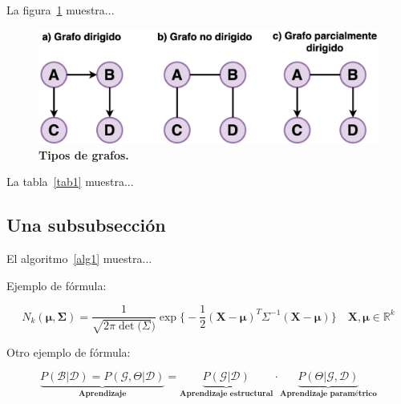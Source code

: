 La figura~\ref{fig1} muestra...

\begin{figure}[ht!]
  \centering
  \includegraphics[scale=0.15]{figuras/fig1.png}
  \caption[Tipos de grafos]{\textbf{Tipos de grafos.}}
  \label{fig1}
\end{figure}

La tabla~\ref{tab1} muestra...



\subsection{Una subsubsección}
\label{una-subsubseccion}

El algoritmo~\ref{alg1} muestra...
\medskip



\newpage

Ejemplo de fórmula:

\begin{equation*}
  N_{k}(\mathbf{\mu},\mathbf{\Sigma}) = \frac{1}{\sqrt{2\pi\det(\Sigma})} \exp \bigg\{ -\frac{1}{2}(\mathbf{X}-\mathbf{\mu})^{T}\Sigma^{-1}(\mathbf{X}-\mathbf{\mu}) \bigg\} \quad \mathbf{X},\mathbf{\mu} \in \mathbb{R}^{k}
\end{equation*}

Otro ejemplo de fórmula:

\begin{equation*}
  \underbrace{P(\mathcal{B}|\mathcal{D}) = P(\mathcal{\mathcal{G}},\Theta|\mathcal{D})}_{\textbf{Aprendizaje}} = \underbrace{P(\mathcal{G}|\mathcal{D})}_{\textbf{Aprendizaje estructural}} \cdot \underbrace{P(\Theta|\mathcal{G},\mathcal{D})}_{\textbf{Aprendizaje paramétrico}}
\end{equation*}

